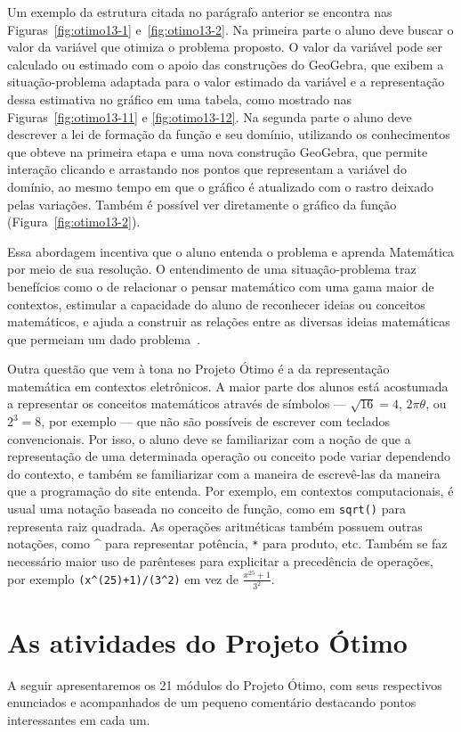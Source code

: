 Um exemplo da estrutura citada no parágrafo anterior se encontra nas Figuras~\ref{fig:otimo13-1} e~\ref{fig:otimo13-2}. Na primeira parte o aluno deve buscar o valor da variável que otimiza o problema proposto. O valor da variável pode ser calculado ou estimado com o apoio das construções do GeoGebra, que exibem a situação-problema adaptada para o valor estimado da variável e a representação dessa estimativa no gráfico em uma tabela, como mostrado nas Figuras~\ref{fig:otimo13-11} e \ref{fig:otimo13-12}. Na segunda parte o aluno deve descrever a lei de formação da função e seu domínio, utilizando os conhecimentos que obteve na primeira etapa e uma nova construção GeoGebra, que permite interação clicando e arrastando nos pontos que representam a variável do domínio, ao mesmo tempo em que o gráfico é atualizado com o rastro deixado pelas variações. Também é possível ver diretamente o gráfico da função (Figura~\ref{fig:otimo13-2}).


Essa abordagem incentiva que o aluno entenda o problema e aprenda Matemática por meio de sua resolução. O entendimento de uma situação-problema traz benefícios como o de relacionar o pensar matemático com uma gama maior de contextos, estimular a capacidade do aluno de reconhecer ideias ou conceitos matemáticos, e ajuda a construir as relações entre as diversas ideias matemáticas que permeiam um dado problema~\cite{schroeder1989developing}.

Outra questão que vem à tona no Projeto Ótimo é a da representação matemática em contextos eletrônicos. A maior parte dos alunos está acostumada a representar os conceitos matemáticos através de símbolos --- $\sqrt{16}=4$, $2\pi\theta$, ou $2^3=8$, por exemplo --- que não são possíveis de escrever com teclados convencionais. Por isso, o aluno deve se familiarizar com a noção de que a representação de uma determinada operação ou conceito pode variar dependendo do contexto, e também se familiarizar com a maneira de escrevê-las da maneira que a programação do site entenda. Por exemplo, em contextos computacionais, é usual uma notação baseada no conceito de função, como em \texttt{sqrt()} para representa raiz quadrada. As operações aritméticas também possuem outras notações, como \^{} para representar potência, \texttt{*} para produto, etc. Também se faz necessário maior uso de parênteses para explicitar a precedência de operações, por exemplo \texttt{(x\^{}(25)+1)/(3\^{}2)} em vez de $\frac{x^{25}+1}{3^2}$.

\section{As atividades do Projeto Ótimo}

A seguir apresentaremos os 21 módulos do Projeto Ótimo, com seus respectivos enunciados e acompanhados de um pequeno comentário destacando pontos interessantes em cada um.

